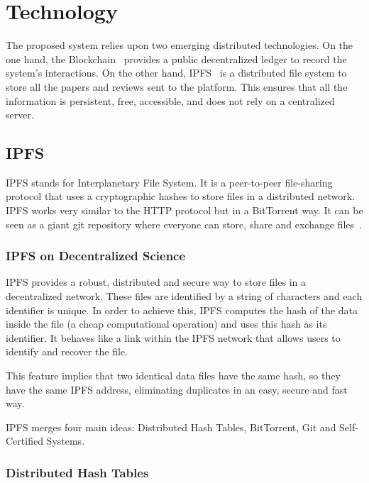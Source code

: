 \section{Technology}
\label{tech}

The proposed system relies upon two emerging distributed technologies. On the
one hand, the Blockchain~\cite{buterin2014ethereum} provides a public
decentralized ledger to record the system's interactions. On the other hand,
IPFS~\cite{benet_ipfs-content_2014} is a distributed file system to store all
the papers and reviews sent to the platform. This ensures that all the
information is persistent, free, accessible, and does not rely on a centralized
server.

\subsection{IPFS}
\label{tech:sec:ipfs}

IPFS stands for Interplanetary File System. It is a peer-to-peer file-sharing
protocol that uses a cryptographic hashes to store files in a distributed
network. IPFS works very similar to the HTTP protocol but in a BitTorrent way.
It can be seen as a giant git repository where everyone can store, share and
exchange files~\cite{benet2014ipfs}.

\subsubsection*{IPFS on Decentralized Science}

IPFS provides a robust, distributed and secure way to store files in a
decentralized network. These files are identified by a string of characters and
each identifier is unique. In order to achieve this, IPFS computes the hash of
the data inside the file (a cheap computational operation) and uses this hash as
its identifier. It behaves like a link within the IPFS network that allows users
to identify and recover the file.

This feature implies that two identical data files have the same hash, so they
have the same IPFS address, eliminating duplicates in an easy, secure and fast
way.

IPFS merges four main ideas: Distributed Hash Tables, BitTorrent, Git and
Self-Certified Systems.

\subsubsection*{Distributed Hash Tables}
\label{tech:sec:ipfs:dht}

